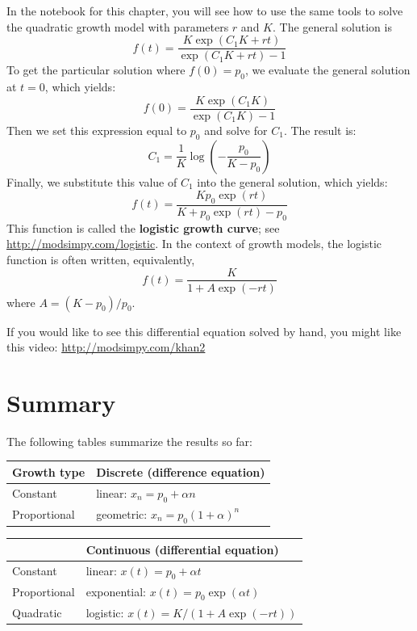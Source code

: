 \documentclass[12pt]{book}
\theoremstyle{exercise}
\begin{document}
In the notebook for this chapter, you will see how to use the same tools to solve the quadratic growth model with parameters $r$ and $K$.  The general solution is
%
\[ f{\left (t \right )} = \frac{K \exp(C_{1} K + r t)}{\exp(C_{1} K + r t) - 1} \]
%
To get the particular solution where $f(0) = p_0$, we evaluate the general solution at $t=0$, which yields:
%
\[ f(0) = \frac{K \exp(C_{1} K)}{\exp(C_{1} K) - 1} \]
%
Then we set this expression equal to $p_0$ and solve for $C_1$.  The result is:
%
\[ C_1 = \frac{1}{K} \log{\left (- \frac{p_{0}}{K - p_{0}} \right )} \]
%
Finally, we substitute this value of $C_1$ into the general solution, which yields:
%
\[ f(t) = \frac{K p_{0} \exp(r t)}{K + p_{0} \exp(r t) - p_{0}} \]
%
This function is called the {\bf logistic growth curve}; see \url{http://modsimpy.com/logistic}.  In the context of growth models, the logistic function is often written, equivalently,
%
\[ f(t) = \frac{K}{1 + A \exp(-rt)} \]
%
where $A = (K - p_0) / p_0$.

If you would like to see this differential equation solved by hand, you might like this video: \url{http://modsimpy.com/khan2}


\section{Summary}

The following tables summarize the results so far:

\begin{tabular}{l|l} 
\hline
Growth type         & Discrete (difference equation) \\ 
\hline 
Constant & linear: $x_n = p_0 + \alpha n$  \\ 
 
Proportional & geometric: $x_n = p_0(1+\alpha)^n$  \\ 

\end{tabular} 

\begin{tabular}{l|l} 
\hline
        & Continuous (differential equation) \\ 
\hline 
Constant & linear: $x(t) = p_0 + \alpha t$ \\ 
 
Proportional & exponential: $x(t) = p_0 \exp(\alpha t)$ \\ 
 
Quadratic & logistic: $x(t) = K / (1 + A\exp(-rt))$ \\ 
\end{tabular} 
\end{document}
